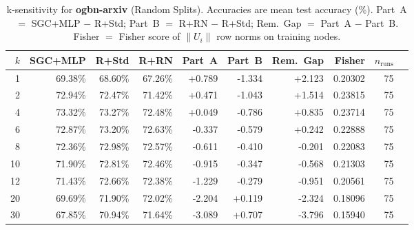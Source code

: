 \begin{table}[t]
\centering\small\setlength{\tabcolsep}{5pt}
\caption{k-sensitivity for \textbf{ogbn-arxiv} (Random Splits). Accuracies are mean test accuracy (\%). Part~A $=$ SGC+MLP $-$ R+Std; Part~B $=$ R+RN $-$ R+Std; Rem.~Gap $=$ Part~A $-$ Part~B. Fisher $=$ Fisher score of $\|U_i\|$ row norms on training nodes.}
\label{tab:exp8_per_dataset_ogbn-arxiv_random}
\begin{tabular}{rrrrrrrrrr}
\toprule
$k$ & SGC+MLP & R+Std & R+RN & Part~A & Part~B & Rem.~Gap & Fisher & $n_{\mathrm{runs}}$ \\
\midrule
1 & 69.38\% & 68.60\% & 67.26\% & +0.789 & -1.334 & +2.123 & 0.20302 & 75 \\
2 & 72.94\% & 72.47\% & 71.42\% & +0.471 & -1.043 & +1.514 & 0.23815 & 75 \\
4 & 73.32\% & 73.27\% & 72.48\% & +0.049 & -0.786 & +0.835 & 0.23714 & 75 \\
6 & 72.87\% & 73.20\% & 72.63\% & -0.337 & -0.579 & +0.242 & 0.22888 & 75 \\
8 & 72.36\% & 72.98\% & 72.57\% & -0.611 & -0.410 & -0.201 & 0.22083 & 75 \\
10 & 71.90\% & 72.81\% & 72.46\% & -0.915 & -0.347 & -0.568 & 0.21303 & 75 \\
12 & 71.43\% & 72.66\% & 72.38\% & -1.229 & -0.279 & -0.951 & 0.20561 & 75 \\
20 & 69.69\% & 71.90\% & 72.02\% & -2.204 & +0.119 & -2.324 & 0.18096 & 75 \\
30 & 67.85\% & 70.94\% & 71.64\% & -3.089 & +0.707 & -3.796 & 0.15940 & 75 \\
\bottomrule
\end{tabular}
\end{table}
